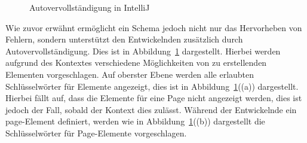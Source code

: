 \begin{figure}[h]
    \centering
    \qquad
    \caption{Autovervollständigung in IntelliJ}
    \label{fig:completion-schema}
\end{figure}

Wie zuvor erwähnt ermöglicht ein Schema jedoch nicht nur das Hervorheben von Fehlern, sondern unterstützt den Entwickelnden zusätzlich durch Autovervollständigung.
Dies ist in Abbildung~\ref{fig:completion-schema} dargestellt.
Hierbei werden aufgrund des Kontextes verschiedene Möglichkeiten von zu erstellenden Elementen vorgeschlagen.
Auf oberster Ebene werden alle erlaubten Schlüsselwörter für Elemente angezeigt, dies ist in Abbildung~\ref{fig:completion-schema}((a)) dargestellt.
Hierbei fällt auf, dass die Elemente für eine Page nicht angezeigt werden, dies ist jedoch der Fall, sobald der Kontext dies zulässt.
Während der Entwickelnde ein page-Element definiert, werden wie in Abbildung~\ref{fig:completion-schema}((b)) dargestellt die Schlüsselwörter für Page-Elemente vorgeschlagen.
